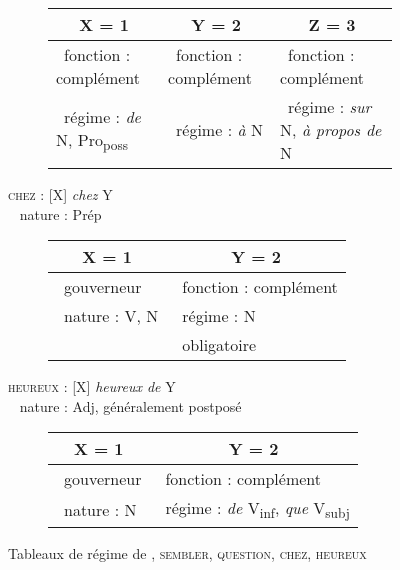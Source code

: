 \begin{figure}[p]
\begin{subfigure}[h]{\textwidth}
		\begin{tabularx}{\textwidth}{|X|X|X|}
			\hline
			\multicolumn{1}{|c|}{X = 1 } & \multicolumn{1}{c|}{Y = 2} & \multicolumn{1}{c|}{Z = 3}\\
			\hline
			\textbullet~fonction : complément  & \textbullet~fonction : complément  & \textbullet~fonction : complément \\
			\textbullet~régime : \textit{de} N, Pro\textsubscript{poss} & \textbullet~régime : \textit{à} N & \textbullet~régime : \textit{sur} N, \textit{à propos de} N \\
			\hline
		\end{tabularx}
	\end{subfigure}%
	\vfill
	\begin{flushleft}
		\textsc{chez} : [X] \textit{chez} Y \\
		\textbullet~ nature : Prép
	\end{flushleft}
	\begin{subfigure}[h]{\textwidth}
		\centering
		\vspace*{-\baselineskip+5pt}
		\begin{tabularx}{\textwidth}{|X|X|}
			\hline
			\multicolumn{1}{|c|}{X = 1 } & \multicolumn{1}{c|}{Y = 2} \\
			\hline
			\textbullet~gouverneur & \textbullet~fonction : complément \\
			\textbullet~nature : V, N & \textbullet~régime : N \\
			& \textbullet~obligatoire \\
			\hline
		\end{tabularx}
	\end{subfigure}%
	\vfill
	\begin{flushleft}
		\textsc{heureux} : [X] \textit{heureux de} Y \\
		\textbullet~ nature : Adj, généralement postposé
	\end{flushleft}
	\begin{subfigure}[h]{\textwidth}
		\centering
		\vspace*{-\baselineskip+5pt}
		\begin{tabularx}{\textwidth}{|X|X|}
			\hline
			\multicolumn{1}{|c|}{X = 1 } & \multicolumn{1}{c|}{Y = 2} \\
			\hline
			\textbullet~gouverneur & \textbullet~fonction : complément \\
			\textbullet~nature : N & \textbullet~régime : \textit{de} V\textsubscript{inf}, \textit{que} V\textsubscript{subj} \\
			\hline
		\end{tabularx}
	\end{subfigure}

\caption{Tableaux de régime de , \textsc{sembler}, \textsc{question}, \textsc{chez}, \textsc{heureux}\label{fig:13-regime}}
\end{figure}

